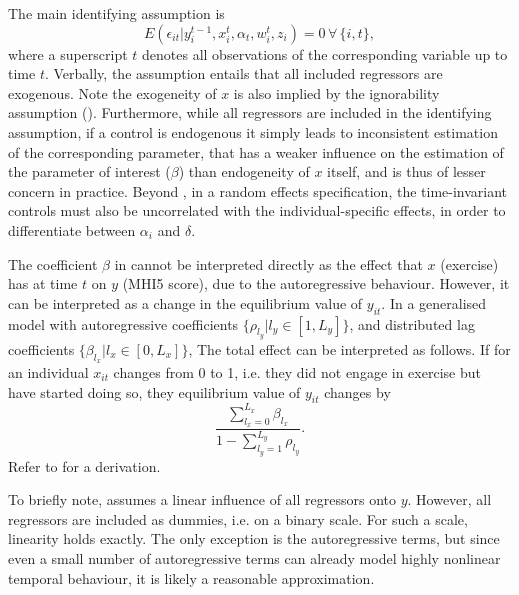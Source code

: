 The main identifying assumption is \cite{moral2019dynamic}
\begin{equation}
    \label{eq:methods:identifying_assumption}
    E(\epsilon_{it} | y_i^{t-1}, x_i^t, \alpha_t, w_{i}^t, z_i) = 0 \,\forall\,\{i,t\},
\end{equation}
where a superscript $t$ denotes all observations of the corresponding variable up to time $t$.
Verbally, the assumption entails that all included regressors are exogenous.
Note the exogeneity of $x$ is also implied by the ignorability assumption ().
Furthermore, while all regressors are included in the identifying assumption, if a control is endogenous it simply
leads to inconsistent estimation of the corresponding parameter, that has a weaker influence on the estimation
of the parameter of interest ($\beta$) than endogeneity of $x$ itself, and is thus of lesser concern in practice.
Beyond , in a random effects specification, the time-invariant controls
must also be uncorrelated with the individual-specific effects, in order to differentiate between $\alpha_i$ and $\delta$.

The coefficient $\beta$ in  cannot be interpreted directly as the effect that $x$ (exercise)
has at time $t$ on $y$ (MHI5 score), due to the autoregressive behaviour. However, it can be interpreted as a change
in the equilibrium value of $y_{it}$.
In a generalised model with autoregressive coefficients $\{\rho_{l_y} | l_y \in [1, L_y]\}$,
and distributed lag coefficients $\{\beta_{l_x} | l_x \in [0, L_x]\}$, The total effect can be interpreted as follows.
If for an individual $x_{it}$ changes from 0 to 1, i.e. they did not
engage in exercise but have started doing so, they equilibrium value of $y_{it}$ changes by
\begin{equation}
    \label{eq:methods:long_run_effect}
    \frac{\sum_{l_x=0}^{L_x} \beta_{l_x}}{1 - \sum_{l_y=1}^{L_y} \rho_{l_y}}.
\end{equation}
Refer to  for a derivation.

To briefly note,  assumes a linear influence of all regressors onto $y$. However, all regressors
are included as dummies, i.e. on a binary scale. For such a scale, linearity holds exactly.
The only exception is the autoregressive terms, but since even a small number of autoregressive terms can already
model highly nonlinear temporal behaviour, it is likely a reasonable approximation.

